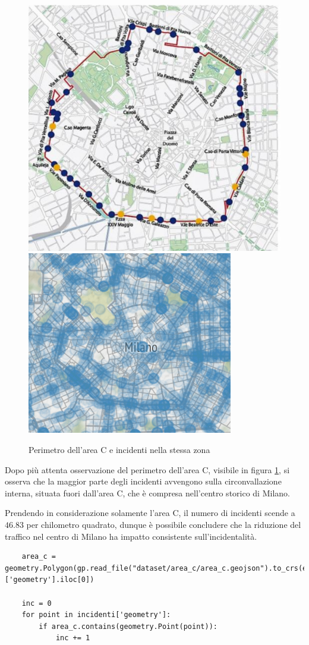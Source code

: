 \documentclass[a4paper]{report}
\begin{document}
\begin{figure}
    \includegraphics[width=0.48\linewidth]{../dataset/area_c/perimetro_area_c.png}
    \includegraphics[width=0.52\linewidth]{../src/area_c/area_c_incidenti.png}
    \caption{Perimetro dell'area C e incidenti nella stessa zona}
    \label{fig:perimetro-area-c}
\end{figure}

Dopo più attenta osservazione del perimetro dell'area C, visibile in figura \ref{fig:perimetro-area-c}, 
si osserva che la maggior parte degli incidenti avvengono sulla circonvallazione interna, 
situata fuori dall'area C, che è compresa nell'centro storico di Milano.

Prendendo in considerazione solamente l'area C, il numero di incidenti scende a $46.83$ 
per chilometro quadrato, dunque è possibile concludere che la riduzione del traffico nel 
centro di Milano ha impatto consistente sull'incidentalità.

\begin{lstlisting}
    area_c = geometry.Polygon(gp.read_file("dataset/area_c/area_c.geojson").to_crs(epsg=3857)['geometry'].iloc[0])

    inc = 0
    for point in incidenti['geometry']: 
        if area_c.contains(geometry.Point(point)): 
            inc += 1
\end{lstlisting}
\end{document}
